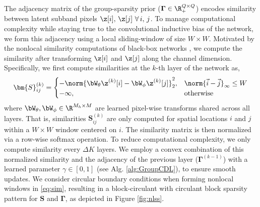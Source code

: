 \documentclass[lettersize,journal]{IEEEtran}
\newcommand{\WINSZ}{W}
\newcommand{\ADJMAT}{\boldsymbol{\Gamma}}
\newcommand{\SIMMAT}{\bm{S}}
\begin{document}
The adjacency matrix of the group-sparsity prior ($\ADJMAT \in \R^{Q\times Q}_+$) encodes
similarity between latent subband pixels $\z[i],\, \z[j] ~ \forall \, i,\, j$.
To manage computational complexity while staying true to the
convolutional inductive bias of the network, we form this adjacency using a local
sliding-window of size $\WINSZ \times \WINSZ$.
Motivated by the nonlocal similarity computations of black-box networks
\cite{liu2018non}, we compute the similarity after transforming $\z[i]$ and
$\z[j]$ along the channel dimension. 
Specifically, we first compute similarities at the $k$-th layer of the network as,
\begin{equation} \label{eq:sim}
    \SIMMAT^{(k)}_{ij} = 
    \begin{cases}
        -\norm{\bW_\theta \z^{(k)}[i] - \bW_\phi \z^{(k)}[j]}_2^2, &
        \norm{\vec{i} - \vec{j}}_\infty \leq \WINSZ \\
        - \infty , & \text{otherwise}
    \end{cases} 
\end{equation}
where
$\bW_\theta, \bW_\phi \in \R^{M_h \times M}$ are learned pixel-wise transforms shared across all layers. 
That is, similarities $\SIMMAT^{(k)}_{ij}$ are only computed for spatial locations $i$ and $j$ within a $W\times W$ window centered on $i$.
The similarity matrix is then normalized via a row-wise softmax
operation. To reduce computational complexity, we only compute similarity every
$\Delta K$ layers. 
We employ a convex combination of this normalized similarity and the adjacency
of the previous layer ($\ADJMAT^{(k-1)}$) with a learned
parameter $\gamma \in [0,1]$ (see Alg. \ref{alg:GroupCDL}), to ensure smooth updates.
We consider circular boundary conditions when forming nonlocal windows in
\eqref{eq:sim}, resulting in a block-circulant with circulant block sparsity
pattern for $\SIMMAT$ and $\ADJMAT$, as depicted in Figure \ref{fig:nlss}. 
\end{document}
